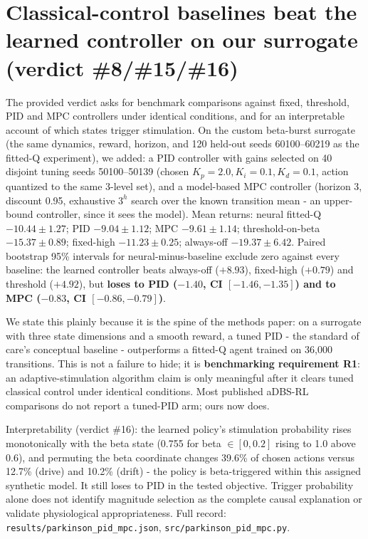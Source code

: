 \section{Classical-control baselines beat the learned controller on our surrogate (verdict \#8/\#15/\#16)}
The provided verdict asks for benchmark comparisons against fixed, threshold, PID and MPC controllers under identical conditions, and for an interpretable account of which states trigger stimulation. On the custom beta-burst surrogate (the same dynamics, reward, horizon, and 120 held-out seeds 60100--60219 as the fitted-Q experiment), we added: a PID controller with gains selected on 40 disjoint tuning seeds 50100--50139 (chosen $K_p{=}2.0, K_i{=}0.1, K_d{=}0.1$, action quantized to the same 3-level set), and a model-based MPC controller (horizon 3, discount 0.95, exhaustive $3^h$ search over the known transition mean - an upper-bound controller, since it sees the model). Mean returns: neural fitted-Q $-10.44 \pm 1.27$; PID $\mathbf{-9.04 \pm 1.12}$; MPC $\mathbf{-9.61 \pm 1.14}$; threshold-on-beta $-15.37 \pm 0.89$; fixed-high $-11.23 \pm 0.25$; always-off $-19.37 \pm 6.42$. Paired bootstrap 95\% intervals for neural-minus-baseline exclude zero against every baseline: the learned controller beats always-off ($+8.93$), fixed-high ($+0.79$) and threshold ($+4.92$), but \textbf{loses to PID ($-1.40$, CI $[-1.46,-1.35]$) and to MPC ($-0.83$, CI $[-0.86,-0.79]$)}.

We state this plainly because it is the spine of the methods paper: on a surrogate with three state dimensions and a smooth reward, a tuned PID - the standard of care's conceptual baseline - outperforms a fitted-Q agent trained on 36{,}000 transitions. This is not a failure to hide; it is \textbf{benchmarking requirement R1}: an adaptive-stimulation algorithm claim is only meaningful after it clears tuned classical control under identical conditions. Most published aDBS-RL comparisons do not report a tuned-PID arm; ours now does.

Interpretability (verdict \#16): the learned policy's stimulation probability rises monotonically with the beta state (0.755 for beta $\in [0,0.2]$ rising to 1.0 above 0.6), and permuting the beta coordinate changes 39.6\% of chosen actions versus 12.7\% (drive) and 10.2\% (drift) - the policy is beta-triggered within this assigned synthetic model. It still loses to PID in the tested objective. Trigger probability alone does not identify magnitude selection as the complete causal explanation or validate physiological appropriateness. Full record: \texttt{results/parkinson\_pid\_mpc.json}, \texttt{src/parkinson\_pid\_mpc.py}.


